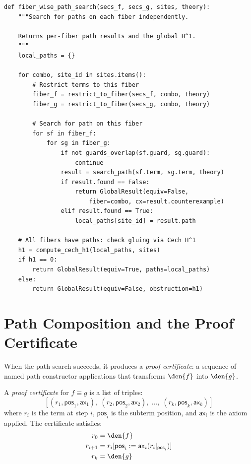 \begin{lstlisting}[caption={Fiber-wise path search}]
def fiber_wise_path_search(secs_f, secs_g, sites, theory):
    """Search for paths on each fiber independently.

    Returns per-fiber path results and the global H^1.
    """
    local_paths = {}

    for combo, site_id in sites.items():
        # Restrict terms to this fiber
        fiber_f = restrict_to_fiber(secs_f, combo, theory)
        fiber_g = restrict_to_fiber(secs_g, combo, theory)

        # Search for path on this fiber
        for sf in fiber_f:
            for sg in fiber_g:
                if not guards_overlap(sf.guard, sg.guard):
                    continue
                result = search_path(sf.term, sg.term, theory)
                if result.found == False:
                    return GlobalResult(equiv=False,
                        fiber=combo, cx=result.counterexample)
                elif result.found == True:
                    local_paths[site_id] = result.path

    # All fibers have paths: check gluing via Cech H^1
    h1 = compute_cech_h1(local_paths, sites)
    if h1 == 0:
        return GlobalResult(equiv=True, paths=local_paths)
    else:
        return GlobalResult(equiv=False, obstruction=h1)
\end{lstlisting}

\section{Path Composition and the Proof Certificate}

When the path search succeeds, it produces a \emph{proof certificate}:
a sequence of named path constructor applications that transforms
$\den{f}$ into $\den{g}$.

\begin{definition}
A \emph{proof certificate} for $f \equiv g$ is a list of triples:
\[
  [(r_1, \mathsf{pos}_1, \mathsf{ax}_1),\;
   (r_2, \mathsf{pos}_2, \mathsf{ax}_2),\;
   \ldots,\;
   (r_k, \mathsf{pos}_k, \mathsf{ax}_k)]
\]
where $r_i$ is the term at step $i$, $\mathsf{pos}_i$ is the subterm
position, and $\mathsf{ax}_i$ is the axiom applied.  The certificate
satisfies:
\begin{align}
  r_0 &= \den{f} \\
  r_{i+1} &= r_i[\mathsf{pos}_i := \mathsf{ax}_i(r_i|_{\mathsf{pos}_i})] \\
  r_k &= \den{g}
\end{align}
\end{definition}

